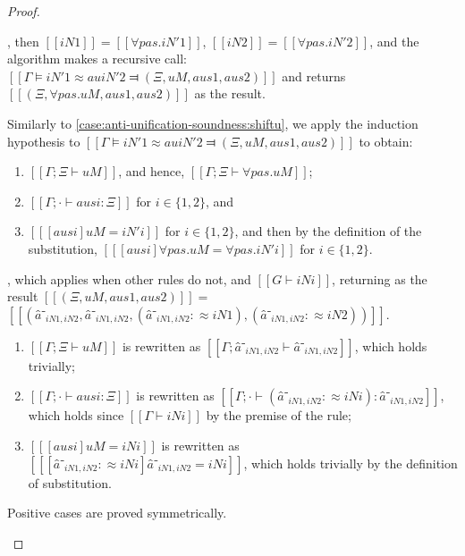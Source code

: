 \begin{proof}
\begin{caseof}
        \item {}, then $[[iN1]] = [[∀pas.iN'1]]$,
                $[[iN2]] = [[∀pas.iN'2]]$, and the algorithm makes a recursive call:
                $[[Γ ⊨ iN'1 ≈au iN'2 ⫤ (Ξ, uM, aus1, aus2)]]$ and
                returns $[[(Ξ, ∀pas.uM, aus1, aus2)]]$ as the result.

                Similarly to \cref{case:anti-unification-soundness:shiftu}, 
                we apply the induction hypothesis to
                $[[Γ ⊨ iN'1 ≈au iN'2 ⫤ (Ξ, uM, aus1, aus2)]]$ to obtain:
                \begin{enumerate}
                    \item $[[Γ; Ξ ⊢ uM]]$, and hence, $[[Γ ; Ξ ⊢ ∀pas.uM]]$;
                    \item $[[Γ; · ⊢ ausi : Ξ]]$ for $i \in \{1,2\}$, and
                    \item $[[ [ausi] uM = iN'i ]]$ for $i \in \{1,2\}$,
                        and then by the definition of the substitution,
                        $[[ [ausi] ∀pas.uM = ∀pas.iN'i ]]$ for $i \in \{1,2\}$. 
                \end{enumerate}

        \item {}, which applies 
        when other rules do not, and $[[G ⊢ iNi]]$,
        returning as the result $[[(Ξ, uM, aus1, aus2)]] = $
        $[[({â⁻_{iN1, iN2}}, â⁻_{iN1, iN2}, (â⁻_{iN1, iN2} :≈ iN1) ,  (â⁻_{iN1, iN2} :≈ iN2))]]$.

        \begin{enumerate}
            \item $[[Γ ; Ξ ⊢ uM]]$ is rewritten as $[[Γ ; { â⁻_{iN1, iN2} } ⊢ â⁻_{iN1, iN2}]]$,
                which holds trivially;
            \item $[[Γ ; · ⊢ ausi : Ξ]]$ is rewritten as $[[Γ ; · ⊢ (â⁻_{iN1, iN2} :≈ iNi) : {â⁻_{iN1, iN2}}]]$,
                which holds since $[[Γ ⊢ iNi]]$ by the premise of the rule;
            \item $[[ [ausi] uM = iNi ]]$ is rewritten as $[[ [â⁻_{iN1, iN2} :≈ iNi] â⁻_{iN1, iN2} = iNi ]]$,
                which holds trivially by the definition of substitution.
        \end{enumerate}

        \item Positive cases are proved symmetrically.
    \end{caseof}
\end{proof}




